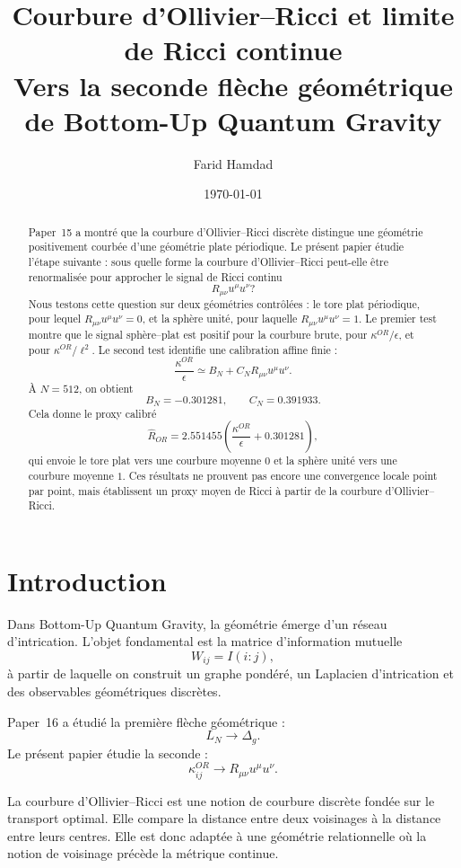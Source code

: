 \documentclass[11pt,a4paper]{article}
\title{
\textbf{Courbure d'Ollivier--Ricci et limite de Ricci continue}\\
\large Vers la seconde flèche géométrique de Bottom-Up Quantum Gravity
}
\author{Farid Hamdad}
\date{\today}
\begin{document}
\maketitle

\begin{abstract}
Paper~15 a montré que la courbure d'Ollivier--Ricci discrète distingue une
géométrie positivement courbée d'une géométrie plate périodique. Le présent
papier étudie l'étape suivante : sous quelle forme la courbure
d'Ollivier--Ricci peut-elle être renormalisée pour approcher le signal de
Ricci continu
\[
R_{\mu\nu}u^\mu u^\nu ?
\]
Nous testons cette question sur deux géométries contrôlées : le tore plat
périodique, pour lequel \(R_{\mu\nu}u^\mu u^\nu=0\), et la sphère unité, pour
laquelle \(R_{\mu\nu}u^\mu u^\nu=1\). Le premier test montre que le signal
sphère--plat est positif pour la courbure brute, pour
\(\kappa^{OR}/\epsilon\), et pour \(\kappa^{OR}/\ell^2\). Le second test
identifie une calibration affine finie :
\[
\frac{\kappa^{OR}}{\epsilon}
\simeq
B_N+C_N R_{\mu\nu}u^\mu u^\nu.
\]
À \(N=512\), on obtient
\[
B_N=-0.301281,
\qquad
C_N=0.391933.
\]
Cela donne le proxy calibré
\[
\widehat{R}_{OR}
=
2.551455
\left(
\frac{\kappa^{OR}}{\epsilon}
+
0.301281
\right),
\]
qui envoie le tore plat vers une courbure moyenne \(0\) et la sphère unité
vers une courbure moyenne \(1\). Ces résultats ne prouvent pas encore une
convergence locale point par point, mais établissent un proxy moyen de Ricci
à partir de la courbure d'Ollivier--Ricci.
\end{abstract}

\tableofcontents

\section{Introduction}

Dans Bottom-Up Quantum Gravity, la géométrie émerge d'un réseau
d'intrication. L'objet fondamental est la matrice d'information mutuelle
\[
W_{ij}=I(i:j),
\]
à partir de laquelle on construit un graphe pondéré, un Laplacien
d'intrication et des observables géométriques discrètes.

Paper~16 a étudié la première flèche géométrique :
\[
L_N\longrightarrow\Delta_g.
\]
Le présent papier étudie la seconde :
\[
\kappa_{ij}^{OR}
\longrightarrow
R_{\mu\nu}u^\mu u^\nu.
\]

La courbure d'Ollivier--Ricci est une notion de courbure discrète fondée sur
le transport optimal. Elle compare la distance entre deux voisinages à la
distance entre leurs centres. Elle est donc adaptée à une géométrie
relationnelle où la notion de voisinage précède la métrique continue.
\end{document}
